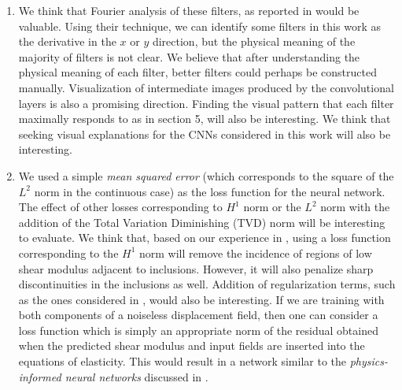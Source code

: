 \documentclass[12pt]{article}
\begin{document}
\begin{enumerate}
\item{We think that Fourier analysis of these filters, as reported in \cite{paper:pateloberai2019} would be valuable. Using their technique, we can identify some filters in this work as the derivative in the $x$ or $y$ direction, but the physical meaning of the majority of filters is not clear. We believe that after understanding the physical meaning of each filter, better filters could perhaps be constructed manually. Visualization of intermediate images produced by the convolutional layers is also a promising direction. Finding the visual pattern that each filter maximally responds to as in \cite{book:chollet} section 5, will also be interesting. We think that seeking visual explanations \cite{paper:selvaraju_2019} for the CNNs considered in this work will also be interesting.}
\item{We used a simple \textit{mean squared error} (which corresponds to the square of the $L^2$ norm in the continuous case) as the loss function for the neural network. The effect of other losses corresponding to $H^1$ norm or the $L^2$ norm with the addition of the Total Variation Diminishing (TVD) norm will be interesting to evaluate. We think that, based on our experience in \cite{diss:gokhale2007}, using a loss function corresponding to the $H^1$ norm will remove the incidence of regions of low shear modulus adjacent to inclusions. However, it will also penalize sharp discontinuities in the inclusions as well. Addition of regularization terms, such as the ones considered in \cite{diss:gokhale2007}, would also be interesting. If we are training with both components of a noiseless displacement field, then one can consider a loss function which is simply an appropriate norm of the  residual obtained when the predicted shear modulus and input fields are inserted into the equations of elasticity. This would result in a network similar to the \textit{physics-informed neural networks} discussed in \cite{paper:pinnkarniadakis}.}

\end{enumerate}
\end{document}
